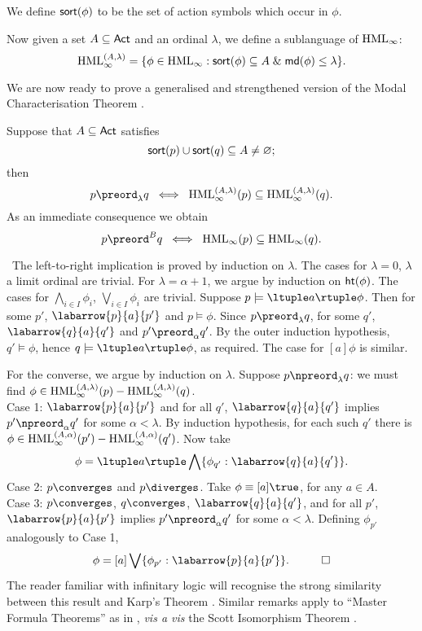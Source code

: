 We define ${\sf sort}( \phi )$ to be the set of action symbols which occur in $\phi$.

Now given a set $A \subseteq {\sf Act}$ and an ordinal $\lambda$, we define a sublanguage of ${\rm HML}_{\infty}$:
\[ {\rm HML}^{(A, \lambda )}_{\infty} = \{ \phi \in {\rm HML}_{\infty} : {\sf sort}( \phi ) \subseteq A \; \& \; {\sf md} ( \phi ) \leq \lambda \} . \]

We are now ready to prove a generalised and strengthened version of the Modal Characterisation Theorem \cite{Mil81,Mil85,HM85}.

\begin{theorem}
\label{mct}
Suppose that $A \subseteq {\sf Act}$ satisfies
\[ {\sf sort}(p) \cup {\sf sort}(q) \subseteq A \not= \varnothing ; \]
then 
\[ p \preord_{\lambda} q \;\; \Longleftrightarrow \;\; {\rm HML}^{(A, \lambda )}_{\infty} (p) \subseteq  {\rm HML}^{(A, \lambda )}_{\infty} (q). \]
As an immediate consequence we obtain
\[  p \preord^{B} q \;\; \Longleftrightarrow \;\; {\rm HML}_{\infty} (p) \subseteq  {\rm HML}_{\infty} (q). \]
\end{theorem}

\proof\ The left-to-right implication is proved by induction on $\lambda$. 
The cases for $\lambda = 0$, $\lambda$ a limit ordinal are trivial. 
For $\lambda = \alpha + 1$, we argue by induction on ${\sf ht}(\phi )$. 
The cases for $\bigwedge_{i \in I} \phi_{i}$, $\bigvee_{i \in I} \phi_{i}$ are trivial. 
Suppose $p \models {\ltuple a \rtuple} \phi$. 
Then for some $p'$, $\labarrow{p}{a}{p'}$ and $p \models \phi$. 
Since $p \preord_{\lambda} q$, for some $q'$, $\labarrow{q}{a}{q'}$ and $p' \preord_{\alpha} q'$. 
By the outer induction hypothesis, $q' \models \phi$, hence $q \models {\ltuple a \rtuple} \phi$, as required. 
The case for ${[a]} \phi$ is similar.

For the converse, we argue by induction on $\lambda$. 
Suppose $p \npreord_{\lambda} q$: we must find $\phi \in  {\rm HML}^{(A, \lambda )}_{\infty} (p) -  {\rm HML}^{(A, \lambda )}_{\infty} (q)$. \\
Case 1: $\labarrow{p}{a}{p'}$ and for all $q'$, $\labarrow{q}{a}{q'}$ implies $p' \npreord_{\alpha} q'$ for some $\alpha < \lambda$. 
By induction hypothesis, for each such $q'$ there is $\phi \in  {\rm HML}^{(A, \alpha )}_{\infty} (p') -  {\rm HML}^{(A, \alpha )}_{\infty} (q')$. 
Now take
\[ \phi = {\ltuple a \rtuple} \bigwedge \{ \phi_{q'} : \labarrow{q}{a}{q'} \} . \]
Case 2: $p \converges$ and $p \diverges$. Take $\phi \equiv {[a]} \true$, for any $a \in A$. \\
Case 3: $p \converges$, $q \converges$, $\labarrow{q}{a}{q'}$, and for all $p'$, $\labarrow{p}{a}{p'}$ implies $p' \npreord_{\alpha} q'$ for some $\alpha < \lambda$. 
Defining $\phi_{p'}$ analogously to Case 1,
\[ \phi = {[a]} \bigvee \{ \phi_{p'} : \labarrow{p}{a}{p'} \} . \;\;\; \qed \]
The reader familiar with infinitary logic will recognise the strong similarity between this result and Karp's Theorem \cite{Barw75}.
Similar remarks apply to ``Master Formula Theorems'' as in \cite{Rou85}, {\em vis a vis}  the
Scott Isomorphism Theorem \cite{Barw75}.

